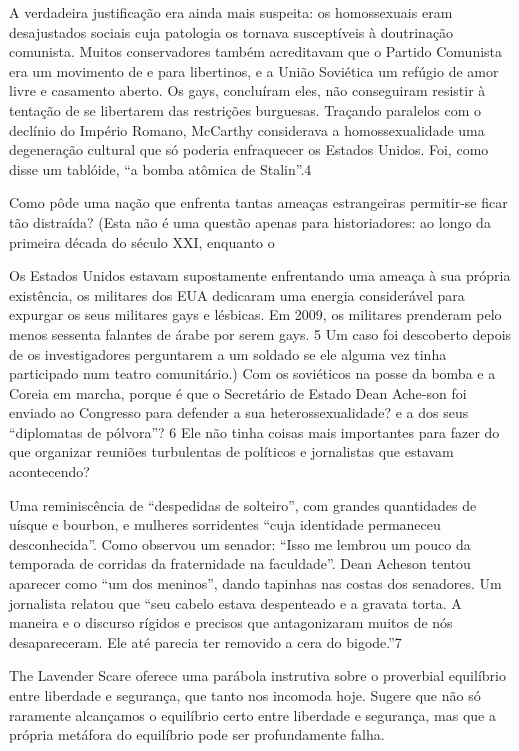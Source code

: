 A verdadeira justificação era ainda mais suspeita: os homossexuais eram desajustados sociais cuja patologia os tornava susceptíveis à doutrinação comunista. Muitos conservadores também acreditavam que o Partido Comunista era um movimento de e para libertinos, e a União Soviética um refúgio de amor livre e casamento aberto. Os gays, concluíram eles, não conseguiram resistir à tentação de se libertarem das restrições burguesas. Traçando paralelos com o declínio do Império Romano, McCarthy considerava a homossexualidade uma degeneração cultural que só poderia enfraquecer os Estados Unidos. Foi, como disse um tablóide, “a bomba atômica de Stalin”.{\color{blue}4}
 \par 
Como pôde uma nação que enfrenta tantas ameaças estrangeiras permitir-se ficar tão distraída? (Esta não é uma questão apenas para historiadores: ao longo da primeira década do século XXI, enquanto o
 \par 
Os Estados Unidos estavam supostamente enfrentando uma ameaça à sua própria existência, os militares dos EUA dedicaram uma energia considerável para expurgar os seus militares gays e lésbicas. Em 2009, os militares prenderam pelo menos sessenta falantes de árabe por serem gays. {\color{blue}5} Um caso foi descoberto depois de os investigadores perguntarem a um soldado se ele alguma vez tinha participado num teatro comunitário.) Com os soviéticos na posse da bomba e a Coreia em marcha, porque é que o Secretário de Estado Dean Ache-son foi enviado ao Congresso para defender a sua heterossexualidade? e a dos seus “diplomatas de pólvora”? {\color{blue}6} Ele não tinha coisas mais importantes para fazer do que organizar reuniões turbulentas de políticos e jornalistas que estavam acontecendo?
 \par 
Uma reminiscência de “despedidas de solteiro”, com grandes quantidades de uísque e bourbon, e mulheres sorridentes “cuja identidade permaneceu desconhecida”. Como observou um senador: “Isso me lembrou um pouco da temporada de corridas da fraternidade na faculdade”. Dean Acheson tentou aparecer como “um dos meninos”, dando tapinhas nas costas dos senadores. Um jornalista relatou que “seu cabelo estava despenteado e a gravata torta. A maneira e o discurso rígidos e precisos que antagonizaram muitos de nós desapareceram. Ele até parecia ter removido a cera do bigode.”{\color{blue}7}
 \par 
The Lavender Scare oferece uma parábola instrutiva sobre o proverbial equilíbrio entre liberdade e segurança, que tanto nos incomoda hoje. Sugere que não só raramente alcançamos o equilíbrio certo entre liberdade e segurança, mas que a própria metáfora do equilíbrio pode ser profundamente falha.
